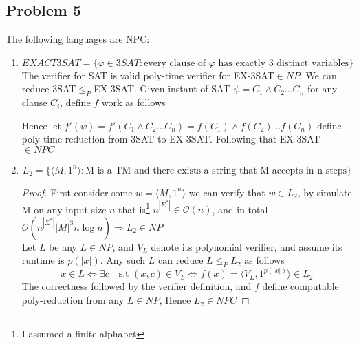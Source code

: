 \documentclass[12pt]{article}
\begin{document}
\subsection*{Problem 5} 
 The following languages are NPC:
\begin{enumerate}[label=(\alph*)]
\item \[ EXACT3SAT=\{\varphi \in 3SAT:\text{every clause of $\varphi$ has exactly 3 distinct variables}\}
\]
The verifier for SAT is valid poly-time verifier for   EX-3SAT$\in NP $. We can reduce 3SAT$\le_P$EX-3SAT. Given instant of SAT $\psi=C_1\wedge C_2 \dots C_n$  for any clause $C_i$, define $f$  work as follows
Hence let  $f'(\psi)=f'(C_1\wedge C_2 \dots C_n)=f(C_1)\wedge f(C_2)\dots f(C_n)$ define poly-time reduction from 3SAT to EX-3SAT. Following that EX-3SAT$\in NPC$ 
\item \[ L_2=\{\langle M,1^n \rangle :\text{M is a TM and there exists a string that M accepts in n steps}\}
\]
\begin{proof} 
First consider some $w=\langle M,1^n \rangle $ we can verify that $w\in L_2$, by simulate M on any input size $n$ that is\footnote{ I assumed a finite alphabet } $n^{|\Sigma ^*|}\in \mathcal{O}(n)$, and in total $\mathcal{O}(n^{|\Sigma ^*|} |M|^3n \log n ) \Rightarrow L_2\in NP$\\
Let $L$ be any $L\in NP$, and  $V_L$ denote its polynomial  verifier, and assume its runtime is $p(|x|)$. Any such $L$ can reduce $L\le_P L_2$ as follows
\[x\in L \Leftrightarrow \exists c \quad \text{s.t } (x,c)\in V_L \Leftrightarrow f(x)=\langle V_L,1^{p(|x|)}\rangle\in L_2 
\]
The correctness followed by the verifier definition, and $f$ define computable poly-reduction from any $L\in NP$, Hence $L_2\in NPC$
\end{proof} 
\end{enumerate}
\end{document}

